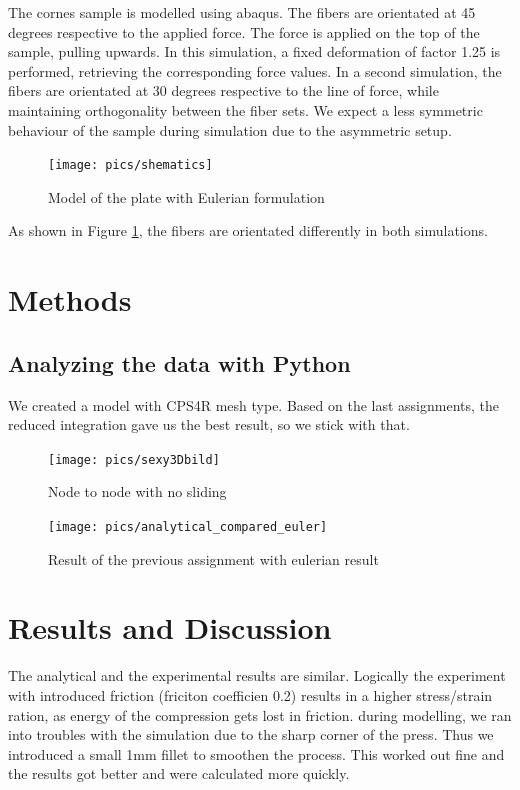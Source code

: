 \documentclass[12pt]{article}
\begin{document}
The cornes sample is modelled using abaqus. The fibers are orientated at 45 degrees respective to
the applied force. The force is applied on the top of the sample, pulling upwards.
In this simulation, a fixed deformation of factor 1.25 is performed, retrieving the corresponding 
force values.
In a second simulation, the fibers are orientated  at 30 degrees respective to the line of force,
while maintaining orthogonality between the fiber sets. We expect a less symmetric behaviour of the sample
during simulation due to the asymmetric setup.

\begin{figure}[!htb]
  \centering
  \texttt{[image: pics/shematics]}
  \caption{Model of the plate with Eulerian formulation}
  \label{fig:1}
\end{figure}

\noindent As shown in Figure \ref{fig:1}, the fibers are orientated differently in both simulations.

\newpage
\section{Methods}

\subsection{Analyzing the data with Python}

We created a model with CPS4R mesh type. Based on the last assignments, the reduced integration
gave us the best result, so we stick with that.

\begin{figure}[!htb]
  \centering
  \texttt{[image: pics/sexy3Dbild]}
  \caption{Node to node with no sliding}
  \label{fig:2}
\end{figure}

\begin{figure}[!htb]
  \centering
  \texttt{[image: pics/analytical\_compared\_euler]}
  \caption{Result of the previous assignment with eulerian result}
  \label{fig:3}
\end{figure}


\pagebreak
\section{Results and Discussion}

The analytical and the experimental results are similar.
Logically the experiment with introduced friction (friciton coefficien 0.2) results in a higher
stress/strain ration, as energy of the compression gets lost in friction. 
during modelling, we ran into troubles with the simulation due to the sharp corner of the press.
Thus we introduced a small 1mm fillet to smoothen the process. This worked out fine and the results 
got better and were calculated more quickly.
\end{document}
